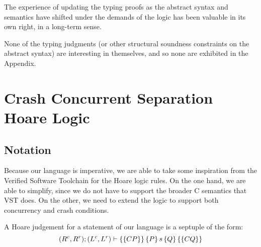 The experience of updating the typing proofs as the abstract syntax
and semantics have shifted under the demands of the logic has been
valuable in its own right, in a long-term sense.

None of the typing judgments (or other structural soundness
constraints on the abstract syntax) are interesting in themselves, and
so none are exhibited in the Appendix.

%

\section{Crash Concurrent Separation Hoare Logic}
\label{sec:logic}

\subsection{Notation}

Because our language is imperative, we are able to take some inspiration from
the Verified Software Toolchain for the Hoare logic rules.
On the one hand, we
are able to simplify, since we do not have to support the broader C semantics
that VST does.
On the other, we need to extend the logic to support both
concurrency and crash conditions.

A Hoare judgement for a statement of our language is a septuple of the form:
\begin{equation*}
(R^c,R^r); (L^c,L^r) \vdash \left\{\left\{ CP \right\}\right\} \left\{ P \right\} s \left\{ Q \right\} \left\{\left\{ CQ \right\}\right\}
\end{equation*}

